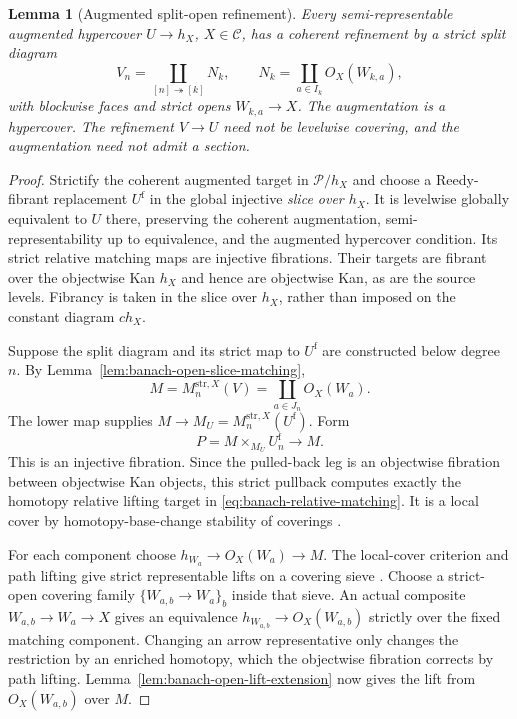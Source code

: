 \documentclass[12pt]{amsart}
\newtheorem{lem}[thm]{Lemma}
\theoremstyle{definition}
\theoremstyle{remark}
\numberwithin{equation}{section}
\begin{document}
\begin{lem}[Augmented split-open refinement]
Every semi-representable augmented hypercover
$U\to h_X$, $X\in\mathcal C$, has a coherent
refinement by a strict split diagram
\[
 V_n=\coprod_{[n]\twoheadrightarrow[k]}N_k,\qquad
 N_k=\coprod_{a\in I_k}O_X(W_{k,a}),
\]
with blockwise faces and strict opens $W_{k,a}\to X$.
\label{lem:banach-bounded-open-refinement}
The augmentation is a hypercover. The refinement
$V\to U$ need not be levelwise covering, and the
augmentation need not admit a section.
\end{lem}

\begin{proof}
Strictify the coherent augmented target in
$\mathcal P/h_X$ and choose a Reedy-fibrant replacement
$U^{\mathrm f}$ in the global injective \emph{slice
over $h_X$}. It is levelwise globally equivalent
to $U$ there, preserving the coherent augmentation,
semi-representability up to equivalence, and the
augmented hypercover condition. Its strict relative
matching maps are injective fibrations. Their targets
are fibrant over the objectwise Kan $h_X$ and hence
are objectwise Kan, as are the source levels.
Fibrancy is taken in the slice over $h_X$, rather
than imposed on the constant diagram $c h_X$.

Suppose the split diagram and its strict map to
$U^{\mathrm f}$ are constructed below degree $n$.
By Lemma~\ref{lem:banach-open-slice-matching},
\[
 M=M_n^{\mathrm{str},X}(V)
   =\coprod_{a\in J_n}O_X(W_a).
\]
The lower map supplies $M\to
M_U=M_n^{\mathrm{str},X}(U^{\mathrm f})$. Form
\[
 P=M\times_{M_U}U^{\mathrm f}_n\longrightarrow M.
\]
This is an injective fibration. Since the pulled-back
leg is an objectwise fibration between objectwise
Kan objects, this strict pullback computes
exactly the homotopy relative lifting target in
\eqref{eq:banach-relative-matching}.
It is a local cover by homotopy-base-change stability
of coverings \cite[Corollary~3.1.6]{HAGI2005}.

For each component choose $h_{W_a}\to O_X(W_a)\to M$.
The local-cover criterion and path lifting give
strict representable lifts on a covering sieve
\cite[Proposition~3.1.4 and Remark~3.1.5]{HAGI2005}.
Choose a strict-open covering family
$\{W_{a,b}\to W_a\}_b$ inside that sieve.
An actual composite $W_{a,b}\to W_a\to X$ gives
an equivalence $h_{W_{a,b}}\to O_X(W_{a,b})$
strictly over the fixed matching component.
Changing an arrow representative only changes
the restriction by an enriched homotopy, which
the objectwise fibration corrects by path lifting.
Lemma~\ref{lem:banach-open-lift-extension} now gives
the lift from $O_X(W_{a,b})$ over $M$.


\end{proof}
\end{document}
